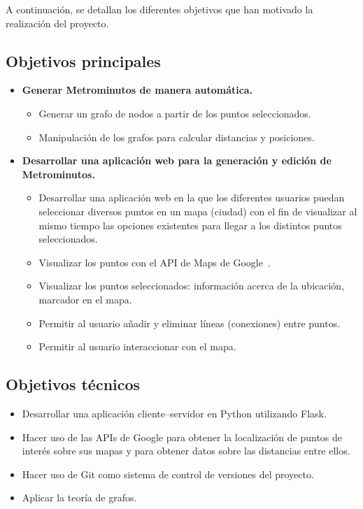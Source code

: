 
A continuación, se detallan los diferentes objetivos que han motivado la realización del proyecto.

\subsection{Objetivos principales}

\begin{itemize}
	\item \textbf{Generar Metrominutos de manera automática.}
	\begin{itemize}
		\item Generar un grafo de nodos a partir de los puntos seleccionados.
		\item Manipulación de los grafos para calcular distancias y posiciones.
	\end{itemize}

	\item \textbf{Desarrollar una aplicación web para la generación y edición de Metrominutos.}
	\begin{itemize}
		\item Desarrollar una aplicación web en la que los diferentes usuarios puedan seleccionar diversos puntos en un mapa (ciudad) con el fin de visualizar al mismo tiempo las opciones existentes para llegar a los distintos puntos seleccionados.
		\item Visualizar los puntos con el API de Maps de Google~\cite{doc:google-api-js}.
		\item Visualizar los puntos seleccionados: información acerca de la ubicación, marcador en el mapa.
		\item Permitir al usuario añadir y eliminar líneas (conexiones) entre puntos.
		\item Permitir al usuario interaccionar con el mapa.
	\end{itemize}
\end{itemize}



\subsection{Objetivos técnicos}

\begin{itemize}
	\item Desarrollar una aplicación cliente--servidor en Python utilizando Flask.
	\item Hacer uso de las APIs de Google para obtener la localización de puntos de interés sobre sus mapas y para obtener datos sobre las distancias entre ellos.
	\item Hacer uso de Git como sistema de control de versiones del proyecto.
	\item Aplicar la teoría de grafos.
\end{itemize}

